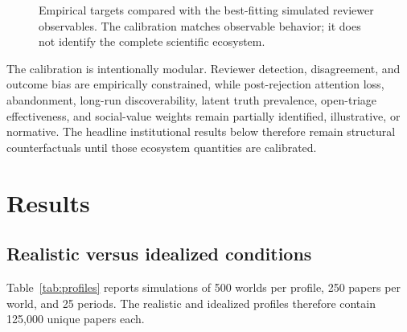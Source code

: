 \documentclass[11pt]{article}
\begin{document}
\begin{figure}[ht]
\centering
{}
\caption{Empirical targets compared with the best-fitting simulated reviewer observables. The calibration matches observable behavior; it does not identify the complete scientific ecosystem.}
\label{fig:empiricalcalibration}
\end{figure}

The calibration is intentionally modular. Reviewer detection, disagreement, and outcome bias are empirically constrained, while post-rejection attention loss, abandonment, long-run discoverability, latent truth prevalence, open-triage effectiveness, and social-value weights remain partially identified, illustrative, or normative. The headline institutional results below therefore remain structural counterfactuals until those ecosystem quantities are calibrated.

\section{Results}

\subsection{Realistic versus idealized conditions}

Table~\ref{tab:profiles} reports simulations of 500 worlds per profile, 250 papers per world, and 25 periods. The realistic and idealized profiles therefore contain 125,000 unique papers each.
\end{document}
